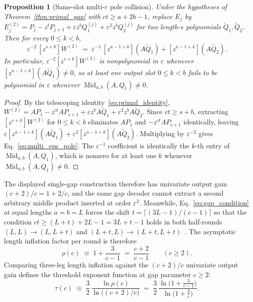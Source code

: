 \documentclass[11pt,a4paper]{article}
\theoremstyle{plain}
\newtheorem{proposition}[theorem]{Proposition}
\theoremstyle{definition}
\theoremstyle{remark}
\DeclareMathOperator{\Mid}{Mid}
\begin{document}
\begin{proposition}[Same-slot multi-$\varepsilon$ pole collision]
\label{prop:multi_eps_collision}
Under the hypotheses of Theorem~\ref{thm:primal_gap} with $ct \ge a + 2b - 1$, replace $E_j$ by $E_j^{(2)} = P_j - z^t P_{j+1} + \varepsilon z^b Q_1^{(j)} + \varepsilon^2 z^b Q_2^{(j)}$ for two length-$s$ polynomials $\widetilde{Q}_1, \widetilde{Q}_2$. Then for every $0 \le k < b$,
\begin{equation}
    \varepsilon^{-2}\,[z^{s+k}] W^{(2)} \;=\; \varepsilon^{-1}\,[z^{a-1+k}](A \widetilde{Q}_1) + [z^{a-1+k}](A \widetilde{Q}_2) .
    \label{eq:multi_eps_pole}
\end{equation}
In particular, $\varepsilon^{-2}[z^{s+k}]W^{(2)}$ is nonpolynomial in $\varepsilon$ whenever $[z^{a-1+k}](A \widetilde{Q}_1) \neq 0$, so at least one output slot $0 \le k < b$ fails to be polynomial in $\varepsilon$ whenever $\Mid_{a,b}(A, Q_1) \neq 0$.
\end{proposition}
\begin{proof}
By the telescoping identity~\eqref{eq:primal_identity}, $W^{(2)} = A P_1 - z^{ct} A P_{c+1} + \varepsilon z^b A\widetilde{Q}_1 + \varepsilon^2 z^b A\widetilde{Q}_2$. Since $ct \ge s + b$, extracting $[z^{s+k}]W^{(2)}$ for $0 \le k < b$ eliminates $A P_1$ and $-z^{ct} A P_{c+1}$ identically, leaving $\varepsilon[z^{a-1+k}](A\widetilde{Q}_1) + \varepsilon^2[z^{a-1+k}](A\widetilde{Q}_2)$. Multiplying by $\varepsilon^{-2}$ gives Eq.~\eqref{eq:multi_eps_pole}. The $\varepsilon^{-1}$ coefficient is identically the $k$-th entry of $\Mid_{a,b}(A, Q_1)$, which is nonzero for at least one $k$ whenever $\Mid_{a,b}(A, Q_1) \neq 0$.
\end{proof}

The displayed single-gap construction therefore has univariate output gain $(c + 2)/c = 1 + 2/c$, and the same gap decoder cannot extract a second arbitrary middle product inserted at order $\varepsilon^2$. Meanwhile, Eq.~\eqref{eq:gap_condition} at equal lengths $a = b = L$ forces the shift $t = \lceil (3L - 1)/(c - 1)\rceil$ so that the condition $ct \ge (L + t) + 2L - 1 = 3L + t - 1$ holds in both half-rounds $(L, L) \to (L, L + t)$ and $(L + t, L) \to (L + t, L + t)$~\cite[Theorem~4.3]{Pass2026}. The asymptotic length inflation factor per round is therefore
\begin{equation}
    \rho(c) \;\equiv\; 1 + \frac{3}{c - 1} \;=\; \frac{c + 2}{c - 1} \qquad (c \ge 2) .
    \label{eq:rho_def}
\end{equation}
Comparing three-leg length inflation against the $(c + 2)/c$ univariate output gain defines the threshold exponent function at gap parameter $c \ge 2$:
\begin{equation}
    \tau(c) \;\equiv\; \frac{3}{2}\,\frac{\ln\rho(c)}{\ln\bigl((c + 2)/c\bigr)} \;=\; \frac{3}{2}\,\frac{\ln\bigl(1 + \frac{3}{c - 1}\bigr)}{\ln\bigl(1 + \frac{2}{c}\bigr)} .
    \label{eq:tau_c_def}
\end{equation}
\end{document}
